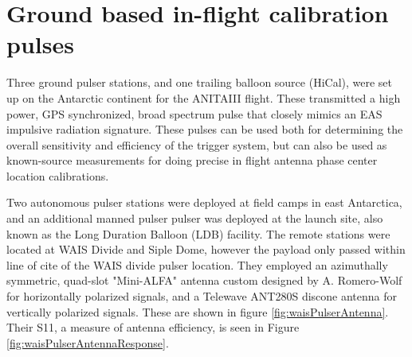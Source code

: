 \section{Ground based in-flight calibration pulses}
	Three ground pulser stations, and one trailing balloon source (HiCal), were set up on the Antarctic continent for the ANITAIII flight.  These transmitted a high power, GPS synchronized, broad spectrum pulse that closely mimics an EAS impulsive radiation signature.  These pulses can be used both for determining the overall sensitivity and efficiency of the trigger system, but can also be used as known-source measurements for doing precise in flight antenna phase center location calibrations.
	
	Two autonomous pulser stations were deployed at field camps in east Antarctica, and an additional manned pulser pulser was deployed at the launch site, also known as the Long Duration Balloon (LDB) facility.  The remote stations were located at WAIS Divide and Siple Dome, however the payload only passed within line of cite of the WAIS divide pulser location.  They employed an azimuthally symmetric, quad-slot "Mini-ALFA" antenna custom designed by A. Romero-Wolf for horizontally polarized signals, and a Telewave ANT280S discone antenna for vertically polarized signals.  These are shown in figure \ref{fig:waisPulserAntenna}.  Their S11, a measure of antenna efficiency, is seen in Figure \ref{fig:waisPulserAntennaResponse}. 
	

